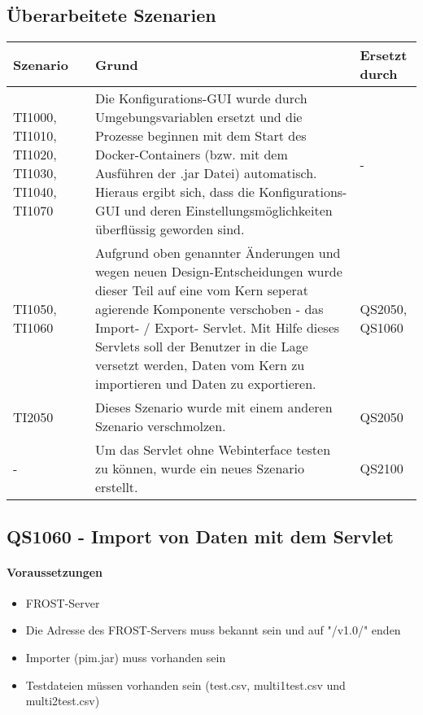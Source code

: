 \subsection{\"Uberarbeitete Szenarien}
\begin{table}[H]
\centering
\begin{tabular}{|L{1.3cm}|L{7cm}|L{2cm}|}
\hline
Szenario & Grund & Ersetzt durch\\
\hline
TI1000, TI1010, TI1020, TI1030, TI1040, TI1070 & Die Konfigurations-GUI wurde durch Umgebungsvariablen ersetzt und die Prozesse beginnen mit dem Start des Docker-Containers (bzw. mit dem Ausf\"uhren der .jar Datei) automatisch.
\newline
Hieraus ergibt sich, dass die Konfigurations-GUI und deren Einstellungsm\"oglichkeiten \"uberfl\"ussig geworden sind. & - \\ \hline
TI1050, TI1060 & Aufgrund oben genannter \"Anderungen und wegen neuen Design-Entscheidungen wurde dieser Teil auf eine vom Kern seperat agierende Komponente verschoben - das Import- / Export- Servlet.
\newline
Mit Hilfe dieses Servlets soll der Benutzer in die Lage versetzt werden, Daten vom Kern zu importieren und Daten zu exportieren. & QS2050, QS1060 \\ \hline
TI2050 & Dieses Szenario wurde mit einem anderen Szenario verschmolzen. & QS2050 \\ \hline
- & Um das Servlet ohne Webinterface testen zu können, wurde ein neues Szenario erstellt. & QS2100 \\ \hline
\end{tabular}
\end{table}

\newpage

\subsection{QS1060 - Import von Daten mit dem Servlet}
\paragraph{Voraussetzungen}
\begin{itemize}
\item FROST-Server
\item Die Adresse des FROST-Servers muss bekannt sein und auf "/v1.0/" enden
\item Importer (pim.jar) muss vorhanden sein
\item Testdateien müssen vorhanden sein (test.csv, multi1test.csv und multi2test.csv)
\end{itemize}
